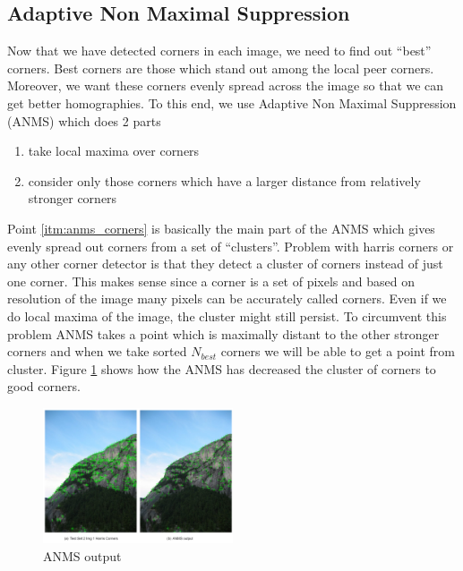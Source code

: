 \documentclass[conference]{IEEEtran}
\begin{document}
\subsection{Adaptive Non Maximal Suppression}
Now that we have detected corners in each image, we need to find out ``best'' corners. Best corners are those which stand out among the local peer corners. Moreover, we want these corners evenly spread across the image so that we can get better homographies. To this end, we use Adaptive Non Maximal Suppression (ANMS) which does 2 parts 
\begin{enumerate}
  \item take local maxima over corners
  \item \label{itm:anms_corners}consider only those corners which have a larger distance from relatively stronger corners
\end{enumerate}
Point \ref{itm:anms_corners} is basically the main part of the ANMS which gives evenly spread out corners from a set of ``clusters''. Problem with harris corners or any other corner detector is that they detect a cluster of corners instead of just one corner. This makes sense since a corner is a set of pixels and based on resolution of the image many pixels can be accurately called corners. Even if we do local maxima of the image, the cluster might still persist. To circumvent this problem ANMS takes a point which is maximally distant to the other stronger corners and when we take sorted $N_{best}$ corners we will be able to get a point from cluster. Figure \ref{fig:anms_corners} shows how the ANMS has decreased the cluster of corners to good corners. 
\begin{figure}[h]
  \centering
  \captionsetup{justification=centering}
  \includegraphics[width=0.5\textwidth]{phase1/anms_corners.png}
  \caption{\label{fig:anms_corners}ANMS output}
\end{figure}
\end{document}
